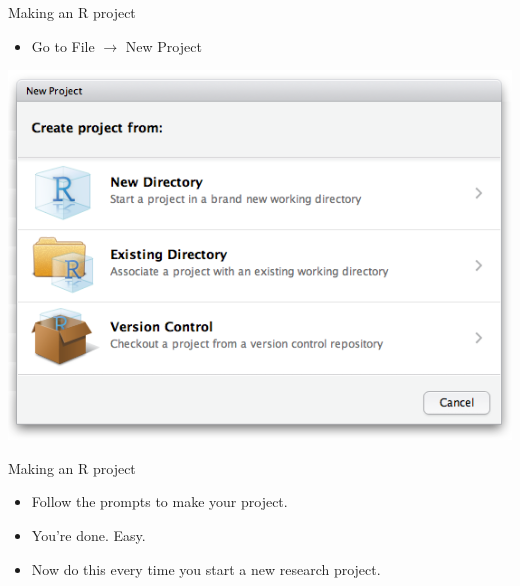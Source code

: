 \documentclass[ignorenonframetext,]{beamer}
\providecommand{\tightlist}{%
  \setlength{\itemsep}{0pt}\setlength{\parskip}{0pt}}
\begin{document}
\begin{frame}{Making an R project}
\protect\hypertarget{making-an-r-project}{}

\begin{itemize}
\tightlist
\item
  Go to File \(\rightarrow\) New Project
\end{itemize}

\begin{center}
  \includegraphics[width=\textwidth,height= .90\textheight,keepaspectratio]{projects_new.png}
\end{center}

\end{frame}

\begin{frame}{Making an R project}
\protect\hypertarget{making-an-r-project-1}{}

\begin{itemize}
\item
  Follow the prompts to make your project.
\item
  You’re done. Easy.
\item
  Now do this \alert{every time} you start a new research project.
\end{itemize}

\end{frame}
\end{document}
